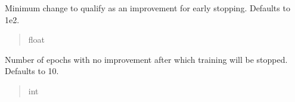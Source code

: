 \documentclass[letterpaper,10pt,english]{sphinxmanual}
\begin{document}
\begin{fulllineitems}
\begin{fulllineitems}
\begin{quote}
\begin{description}
\end{description}\end{quote}

\end{fulllineitems}


\begin{fulllineitems}
\label{\detokenize{application.algorithms.autoencoder:application.algorithms.autoencoder.AutoEncoderConfiguration.AutoEncoderConfiguration.early_stopping_delta}}
\pysigstartsignatures
{}
\pysigstopsignatures
\sphinxAtStartPar
Minimum change to qualify as an improvement for early stopping. Defaults to 1e\sphinxhyphen{}2.
\begin{quote}\begin{description}
\sphinxAtStartPar
float

\end{description}\end{quote}

\end{fulllineitems}


\begin{fulllineitems}
\label{\detokenize{application.algorithms.autoencoder:application.algorithms.autoencoder.AutoEncoderConfiguration.AutoEncoderConfiguration.early_stopping_patience}}
\pysigstartsignatures
{}
\pysigstopsignatures
\sphinxAtStartPar
Number of epochs with no improvement after which training will be stopped. Defaults to 10.
\begin{quote}\begin{description}
\sphinxAtStartPar
int

\end{description}\end{quote}

\end{fulllineitems}


\end{fulllineitems}
\end{document}
